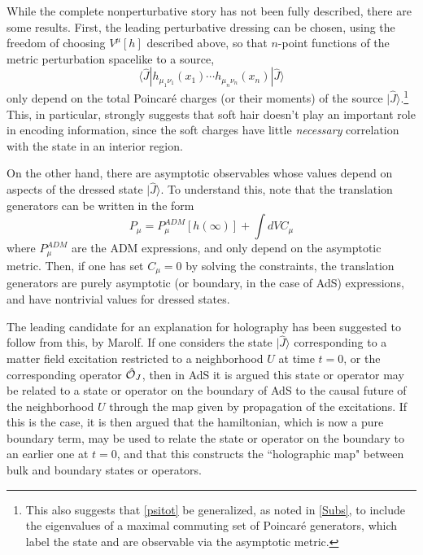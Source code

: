 \documentclass[12pt]{article}
\numberwithin{equation}{section}
\newcommand{\calo}{{\cal O}}
\newcommand{\beq}{\begin{equation}}
\newcommand{\eeq}{\end{equation}}
\begin{document}
While the complete nonperturbative story has not been fully described, there are some results.  First, the leading perturbative dressing can be chosen, using the freedom of choosing $V^\mu[h]$ described above, so that $n$-point functions of the metric perturbation spacelike to a source,
\beq
\langle\widehat J|h_{\mu_1\nu_1}(x_1)\cdots h_{\mu_n\nu_n}(x_n)|\widehat J\rangle
\eeq
only depend on the total Poincar\'e charges (or their moments)\cite{SGsplit} of the source $|\hat J\rangle$.\footnote{This also suggests that \eqref{psitot} be generalized, as noted in \ref{Subs}, to include the eigenvalues of a maximal commuting set of Poincar\'e generators, which label the state and are observable via the asymptotic metric.}  This, in particular, strongly suggests\cite{DoGi3,DoGi4,SGsplit} that soft hair\cite{Hawk-Info,HPS1,HPS2,astrosrev,astrorevisit,HHPS} doesn't play an important role in encoding information, since the soft charges have little {\it necessary} correlation with the state in an interior region.

On the other hand, there are asymptotic observables whose values depend on aspects of the dressed state $|\hat J\rangle$.  To understand this, note that the translation generators can be written in the form
\beq
P_\mu= P_\mu^{ADM}[h(\infty)] + \int dV C_\mu
\eeq
where $P_\mu^{ADM}$ are the ADM expressions, and only depend on the asymptotic metric.  Then, if one has set $C_\mu=0$ by solving the constraints, the translation generators are purely asymptotic (or boundary, in the case of AdS) expressions, and have nontrivial values for dressed states. 

The leading candidate for an explanation for holography has been suggested to follow from this, by Marolf\cite{MaroUH,Marothought, MaroholoNS}.  If one considers the state $|\hat J\rangle$ corresponding to a matter field excitation restricted to a neighborhood $U$ at time $t=0$, or the corresponding operator $\hat\calo_J$, then in AdS it is argued this state or operator may be related to a state or operator on the boundary of AdS to the causal future of the neighborhood $U$ through the map given by propagation of the excitations.  If this is the case, it is then argued that the hamiltonian, which is now a pure boundary term, may be used to relate the state or operator on the boundary to an earlier one at $t=0$, and that this constructs the ``holographic map" between bulk and boundary states or operators.
\end{document}
